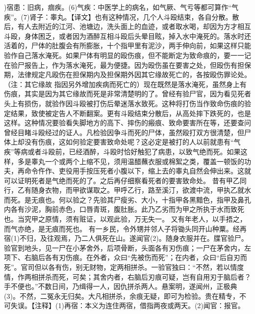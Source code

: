 \documentclass[12pt,UTF8]{ctexbook}
\begin{document}
)宿患：旧病，痼疾。(6)气疾：中医学上的病名，如气厥、气亏等都可算作“气疾”。(7)肾子：睾丸。【译文】也有这种情况，几个人斗殴结束，各自分散。散后，有人去附近的江河、池塘边，洗头面上的血迹，或者取水喝，却因为方才相互斗殴，身体困乏，或者因为酒醉互相斗殴后头晕目眩，掉入水中淹死的。落水时还活着的，尸体的肚腹会有所膨胀，十个指甲里有泥沙，两手伸向前，如果这样只能验作自己落水淹死。如果尸体有明显的殴伤痕，但不能断定为致命痕的，要一一记在验尸报告上，作为落水淹死，最为便捷。因为殴伤虽在要害之处，但殴伤有担保期，法律规定凡殴伤在担保期内及担保期外因其它缘故死亡的，各按殴伤罪论处。（注：其它缘故
指因另外增加疾病而死亡的）现在既然是落水淹死，虽然身上有伤痕，其实是因为其它缘故而死是非常清楚明的了。曾经有验尸官，因为看见死者头上有损伤，就验作因斗殴被打伤后晕迷落水致死。这种将打伤当作致命伤痕的验定结果，致使被定告人不断翻案。更有斗殴结束分散后，从高处摔下跌死的，也是这样。这种情况要验看失脚地方的高下、摔伤的瘢痕、致命要害所在等，还要查问曾经目睹斗殴经过的证人。凡检验因争斗而死的尸体，虽然殴打双方很清楚，但尸体上却没有伤痕，这如何验定要害致命处呢？这必定是被打的人以前就患有“气疾”等病或者斗殴前，已经酒醉，斗殴时恰好触犯了病患，以致气绝而死。如果这样，多是睾丸一个或两个上缩不见，须用温醋蘸衣服或棉絮之类，覆盖一顿饭的功夫，再命令仵作、吏役用手按压死者小腹以下，缩上去的睾丸自然会伸出来。这就可以证明死者是气绝而死的了。之后再仔细察看死者的要害致命处。
昔有甲乙同行，乙有随身衣物，而甲欲谋取之。甲呼乙行，路至溪汀，欲渡中流，甲执乙就水而死。是无痕也。何以验之？先验其尸瘦劣、大小，十指甲各黑黯色，指甲及鼻孔内各有沙泥，胸前赤色，口唇青斑，腹肚胀。此乃乙劣而为甲之所执于水而致死也。当究甲之原情，须有赃证，以观此验，万无失一。
又有年老人，以手捂之，而气亦绝，是无痕而死也。
有一乡民，令外甥并邻人子将锄头同开山种粟。经再宿(1)不归，及往观焉，乃二人俱死在山。遂闻官(2)。随身衣服并在。牒官验尸。验官到地头，见一尸在小茅舍外，后项骨断，头面各有刃伤痕；一尸在茅舍内，左项下、右脑后各有刃伤痕。在外者，众曰“先被伤而死”；在内者，众曰“后自刃而死”。官司但以各有伤，别无财物，定两相拼杀。一验官独曰：“不然，若以情度情，作两相拼杀而死，可矣；其舍内者，右脑后刃痕可疑，岂有自用刃于脑后者？手不便也。”不数日间，乃缉得一人，因仇拼杀两人。悬案明，遂闻州，正极典(3)。不然，二冤永无归矣。大凡相拼杀，余痕无疑，即可为检验。贵在精专，不可失误。【注释】(1)再宿：本义为连住两宿，借指两夜或两天。(2)闻官：报官。
\end{document}
